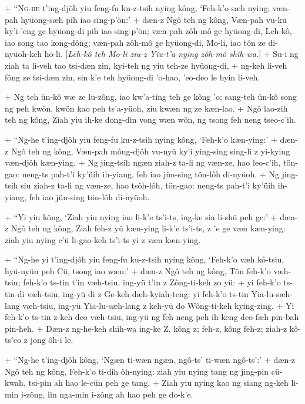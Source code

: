 \par
+	``\textsc{Ng-he} t'ing-djôh yiu feng-fu ku-z-tsih nying kông, `Feh-k'o sæh nying; væn-pah hyüong-sæh pih iao sing-p'ön:'
+	dæn-z Ngô teh ng kông, Væn-pah vu-ku ky'i-'eng ge hyüong-di pih iao sing-p'ön; væn-pah zôh-mô ge hyüong-di, Leh-kô, iao song tao kong-dông; væn-pah zôh-mô ge hyüong-di, Mo-li, iao tön ze di-nyüoh-keh ho-li. [\textit{Leh-kô teh Mo-li ziu-z Yiu-t'a nying zôh-mô shih-wa.}]
+	Su-i ng ziah ta li-veh tao tsi-dæn zin, kyi-teh ng yiu teh-ze hyüong-di,
+	ng-keh li-veh fông ze tsi-dæn zin, sin k'e teh hyüong-di 'o-hao, 'eo-deo le hyin li-veh.
\par
+	Ng teh ün-kô wæ ze lu-zông, iao kw'a-ting teh ge kông 'o; sang-teh ün-kô song ng peh kwön, kwön kao peh ts'a-yüoh, ziu kwæn ng ze kæn-lao.
+	Ngô lao-zih teh ng kông, Ziah yiu ih-ke dong-din vong wæn wön, ng tsong feh neng tseo-c'ih.
\par
+	``Ng-he t'ing-djôh yiu feng-fu ku-z-tsih nying kông, `Feh-k'o kæn-ying:'
+	dæn-z Ngô teh ng kông, Væn-pah mông-djôh vu-nyü ky'i ying-sing sing-li z yi-kying væn-djôh kæn-ying.
+	Ng jing-tsih ngæn ziah-z ta-li ng væn-ze, hao leo-c'ih, tön-gao: neng-ts pah-t'i ky'üih ih-yiang, feh iao jün-sing tön-lôh di-nyüoh.
+	Ng jing-tsih siu ziah-z ta-li ng væn-ze, hao tsôh-lôh, tön-gao: neng-ts pah-t'i ky'üih ih-yiang, feh iao jün-sing tön-lôh di-nyüoh.
\par
+	``Yi yiu kông, `Ziah yiu nying iao li-k'e ts'i-ts, ing-ke sia li-shü peh ge:'
+	dæn-z Ngô teh ng kông, Ziah feh-z yü kæn-ying li-k'e ts'i-ts, z 'e ge væn kæn-ying: ziah yiu nying c'ü li-gao-keh ts'i-ts yi z væn kæn-ying.
\par
+	``Ng-he yi t'ing-djôh yiu feng-fu ku-z-tsih nying kông, `Feh-k'o væh kô-tsiu, hyü-nyün peh Cü, tsong iao wæn:'
+	dæn-z Ngô teh ng kông, Tön feh-k'o væh-tsiu; feh-k'o ts-tin t'in væh-tsiu, ing-yü t'in z Zông-ti-keh zo yü:
+	yi feh-k'o ts-tin di væh-tsiu, ing-yü di z Ge-keh dæh-kyiah-teng: yi feh-k'o ts-tin Yia-lu-sæh-lang væh-tsiu, ing-yü Yia-lu-sæh-lang z keh-yü do Wông-ti-keh kying-zing.
+	Yi feh-k'o ts-tin z-keh deo væh-tsiu, ing-yü ng feh neng peh ih-keng deo-fæh pin-bah pin-heh.
+	Dæn-z ng-he-keh shih-wa ing-ke Z, kông z; feh-z, kông feh-z; ziah-z kô-ts'eo z jong ôh-i le.
\par
+	``Ng-he t'ing-djôh kông, `Ngæn ti-wæn ngæn, ngô-ts' ti-wæn ngô-ts':'
+	dæn-z Ngô teh ng kông, Feh-k'o ti-dih ôh-nying: ziah yiu nying tang ng jing-pin cü-kwah, tsi-pin ah hao le-cün peh ge tang.
+	Ziah yiu nying kao ng siang ng-keh li-min i-zông, lin nga-min i-zông ah hao peh ge do-k'e.
